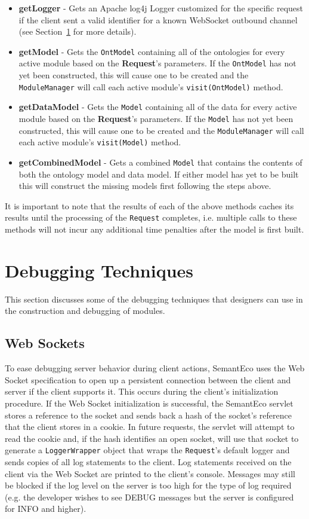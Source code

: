 \documentclass[letterpaper]{report}
\begin{document}
\begin{itemize}
\item\textbf{getLogger} - Gets an Apache log4j Logger customized for the specific request if the client sent a valid identifier for a known WebSocket outbound channel (see Section~\ref{debugging-techniques} for more details).
\item\textbf{getModel} - Gets the \texttt{OntModel} containing all of the ontologies for every active module based on the \textbf{Request}'s parameters. If the \texttt{OntModel} has not yet been constructed, this will cause one to be created and the \texttt{ModuleManager} will call each active module's \texttt{visit(OntModel)} method.
\item\textbf{getDataModel} - Gets the \texttt{Model} containing all of the data for every active module based on the \textbf{Request}'s parameters. If the \texttt{Model} has not yet been constructed, this will cause one to be created and the \texttt{ModuleManager} will call each active module's \texttt{visit(Model)} method.
\item\textbf{getCombinedModel} - Gets a combined \texttt{Model} that contains the contents of both the ontology model and data model. If either model has yet to be built this will construct the missing models first following the steps above.
\end{itemize}

It is important to note that the results of each of the above methods caches its results until the processing of the \texttt{Request} completes, i.e. multiple calls to these methods will not incur any additional time penalties after the model is first built.

\section{Debugging Techniques}
\label{debugging-techniques}
This section discusses some of the debugging techniques that designers can use in the construction and debugging of modules.

\subsection{Web Sockets}
To ease debugging server behavior during client actions, SemantEco uses the Web Socket specification to open up a persistent connection between the client and server if the client supports it. This occurs during the client's initialization procedure. If the Web Socket initialization is successful, the SemantEco servlet stores a reference to the socket and sends back a hash of the socket's reference that the client stores in a cookie. In future requests, the servlet will attempt to read the cookie and, if the hash identifies an open socket, will use that socket to generate a \texttt{LoggerWrapper} object that wraps the \texttt{Request}'s default logger and sends copies of all log statements to the client. Log statements received on the client via the Web Socket are printed to the client's console. Messages may still be blocked if the log level on the server is too high for the type of log required (e.g. the developer wishes to see DEBUG messages but the server is configured for INFO and higher).
\end{document}
